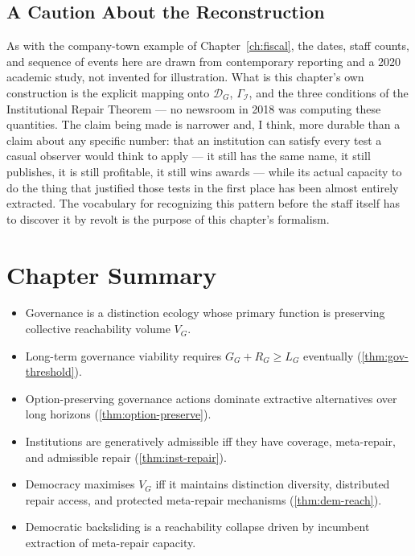 \documentclass[12pt,twoside,openright]{book}
\newenvironment{chapsummary}{%
  \begin{tcolorbox}[colback=DistBlue!5,colframe=DistBlue,
    title={\faBookOpen\enspace Summary},
    fonttitle=\sffamily\bfseries\color{white},
    attach boxed title to top left={yshift=-2mm,xshift=4mm},
    boxed title style={colback=DistBlue,rounded corners}]
  \begin{itemize}[nosep,leftmargin=*]}{%
  \end{itemize}\end{tcolorbox}}
\begin{document}
\subsection{A Caution About the Reconstruction}

As with the company-town example of Chapter~\ref{ch:fiscal}, the
dates, staff counts, and sequence of events here are drawn from
contemporary reporting and a 2020 academic study, not invented
for illustration. What is this chapter's own construction is the
explicit mapping onto $\mathcal{D}_G$, $\Gamma_\mathcal{I}$, and
the three conditions of the Institutional Repair Theorem --- no
newsroom in 2018 was computing these quantities. The claim being
made is narrower and, I think, more durable than a claim about
any specific number: that an institution can satisfy every test
a casual observer would think to apply --- it still has the same
name, it still publishes, it is still profitable, it still wins
awards --- while its actual capacity to do the thing that
justified those tests in the first place has been almost
entirely extracted. The vocabulary for recognizing this pattern
before the staff itself has to discover it by revolt is the
purpose of this chapter's formalism.

\section*{Chapter Summary}
\begin{chapsummary}
  \item Governance is a distinction ecology whose
        primary function is preserving collective
        reachability volume $V_G$.
  \item Long-term governance viability requires
        $G_G + R_G \ge L_G$ eventually
        (\cref{thm:gov-threshold}).
  \item Option-preserving governance actions dominate
        extractive alternatives over long horizons
        (\cref{thm:option-preserve}).
  \item Institutions are generatively admissible iff
        they have coverage, meta-repair, and admissible
        repair (\cref{thm:inst-repair}).
  \item Democracy maximises $V_G$ iff it maintains
        distinction diversity, distributed repair
        access, and protected meta-repair mechanisms
        (\cref{thm:dem-reach}).
  \item Democratic backsliding is a reachability
        collapse driven by incumbent extraction of
        meta-repair capacity.
\end{chapsummary}
\end{document}
